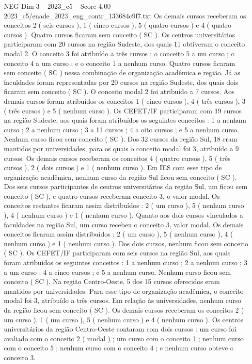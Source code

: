 \begin{textsample}{NEG Dim 3 – 2023\_c5 – Score 4.00 – 2023\_c5/enade\_2023\_eng\_contr\_133684c9f7.txt}
Os demais cursos receberam os conceitos 2 ( seis cursos ), 1 ( cinco cursos ), 5 ( quatro cursos ) e 4 ( quatro cursos ).
Quatro cursos ficaram sem conceito ( SC ).
Os centros universitários participaram com 20 cursos na região Sudeste, dos quais 11 obtiveram o conceito modal 2.
O conceito 3 foi atribuído a três cursos ; o conceito 5 a um curso ; o conceito 4 a um curso ; e o conceito 1 a nenhum curso.
Quatro cursos ficaram sem conceito ( SC ) nessa combinação de organização acadêmica e região.
Já as faculdades foram representadas por 20 cursos na região Sudeste, dos quais dois ficaram sem conceito ( SC ).
O conceito modal 2 foi atribuído a 7 cursos.
Aos demais cursos foram atribuídos os conceitos 1 ( cinco cursos ), 4 ( três cursos ), 3 ( três cursos ) e 5 ( nenhum curso ).
Os CEFET/IF participaram com 19 cursos na região Sudeste, aos quais foram atribuídos os seguintes conceitos : 1 a nenhum curso ; 2 a nenhum curso ; 3 a 11 cursos ; 4 a oito cursos ; e 5 a nenhum curso.
Nenhum curso ficou sem conceito ( SC ).
Dos 32 cursos da região Sul, 18 eram mantidos por universidades, para os quais o conceito modal foi 3, atribuído a 9 cursos.
Os demais cursos receberam os conceitos 4 ( quatro cursos ), 5 ( três cursos ), 2 ( dois cursos ) e 1 ( nenhum curso ).
Em IES com esse tipo de organização acadêmica, nenhum curso da região Sul ficou sem conceito ( SC ).
Dos seis cursos participantes de centros universitários da região Sul, um ficou sem conceito ( SC ), e quatro cursos receberam conceito 3, o valor modal.
Os conceitos restantes ficaram assim distribuídos : 2 ( um curso ), 5 ( nenhum curso ), 4 ( nenhum curso ) e 1 ( nenhum curso ).
Quanto aos dois cursos vinculados a faculdades na região Sul, um curso recebeu o conceito 3, valor modal.
Os demais conceitos ficaram assim distribuídos : 2 ( um curso ), 5 ( nenhum curso ), 4 ( nenhum curso ) e 1 ( nenhum curso ).
Dos dois cursos, nenhum ficou sem conceito ( SC ).
Os CEFET/IF participaram com seis cursos na região Sul, aos quais foram atribuídos os seguintes conceitos : 1 a nenhum curso ; 2 a nenhum curso ; 3 a um curso ; 4 a cinco cursos ; e 5 a nenhum curso.
Nenhum curso ficou sem conceito ( SC ).
Na região Centro-Oeste, 5 dos 15 cursos oferecidos eram mantidos por universidades.
Para esse tipo de organização acadêmica, o conceito modal foi 3, atribuído a três cursos.
Em relação às universidades, nenhum curso da região ficou sem conceito ( SC ).
Os demais cursos receberam os conceitos 2 ( um curso ), 1 ( um curso ), 5 ( nenhum curso ) e 4 ( nenhum curso ).
Os centros universitários da região Centro-Oeste contaram com dois cursos : um curso foi avaliado com o conceito 2 ( modal ) ; um curso com o conceito 1 ; nenhum curso com o conceito 5 ; nenhum curso com o conceito 4 ; e nenhum curso obteve o conceito 3.

\end{textsample}
